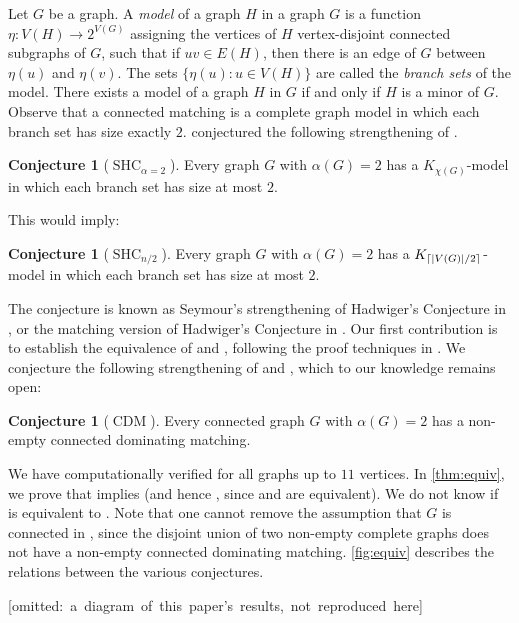 \documentclass[11pt]{article}
\numberwithin{equation}{section}
\theoremstyle{plain}
\theoremstyle{definition}
\newtheorem{conj}[thm]{Conjecture}
\DeclarePairedDelimiter{\ceil}{\lceil}{\rceil}
\DeclareMathOperator{\SHC}{SHC}
\DeclareMathOperator{\CDM}{CDM}
\newcommand{\defn}[1]{\textcolor{green!50!black}{\textit{#1}}}
\newcommand{\conjdefn}[1]{\textcolor{red!50!black}{#1}}
\begin{document}
Let $G$ be a graph. A \defn{model} of a graph $H$ in a graph $G$ is a function $\eta: V(H) \to 2^{V(G)}$ assigning the vertices of $H$ vertex-disjoint connected subgraphs of $G$, such that if $uv \in E(H)$, then there is an edge of $G$ between $\eta(u)$ and $\eta(v)$. The sets $\{\eta(u): u \in V(H)\}$ are called the \defn{branch sets} of the model. There exists a model of a graph $H$ in $G$ if and only if $H$ is a minor of $G$. Observe that a connected matching is a complete graph model in which each branch set has size exactly $2$. \citet{SeymourHC} conjectured the following strengthening of .
\begin{conj}[\conjdefn{$\SHC_{\alpha = 2}$}]
    \label{conj:shc_chi}
    Every graph $G$ with $\alpha(G) = 2$ has a $K_{\chi(G)}$-model in which each branch set has size at most $2$.
\end{conj}
This would imply:
\begin{conj}[\conjdefn{$\SHC_{n/2}$}]
    \label{conj:shc_half}
    Every graph $G$ with $\alpha(G) = 2$ has a $K_{\ceil{|V(G)|/2}}$-model in which each branch set has size at most $2$.
\end{conj}
The conjecture  is known as Seymour's strengthening of Hadwiger's Conjecture in \citep{Blasiak07}, or the matching version of Hadwiger's Conjecture in \citep{CS12}. Our first contribution is to establish the equivalence of  and , following the proof techniques in \citet{PST03}. We conjecture the following strengthening of  and , which to our knowledge remains open:
\begin{conj}[\conjdefn{$\CDM$}]
    \label{conj:cdm}
    Every connected graph $G$ with $\alpha(G) = 2$ has a non-empty connected dominating matching.
\end{conj}
\noindent
\begin{minipage}{0.38\textwidth}
    We have computationally verified  for all graphs up to $11$ vertices.
    In \cref{thm:equiv}, we prove that  implies  (and hence , since  and  are equivalent).
    We do not know if  is equivalent to .
    Note that one cannot remove the assumption that $G$ is connected in , since the disjoint union of two non-empty complete graphs does not have a non-empty connected dominating matching.
    \cref{fig:equiv} describes the relations between the various conjectures.
\end{minipage}%
\hfill
\begin{minipage}{0.57\textwidth}
    \centering
\mbox{[omitted: a diagram of this paper's results, not reproduced here]}%
    \label{fig:equiv}
\end{minipage}
\end{document}
